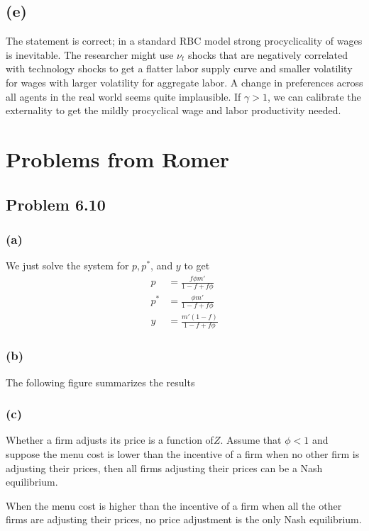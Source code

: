 \documentclass[11pt]{amsart}
\begin{document}
 \subsection*{(e)}
 The statement is correct; in a standard RBC model strong procyclicality of wages is inevitable. 
 The researcher might use $\nu_t$ shocks that are negatively correlated with technology shocks to get a flatter labor supply curve and smaller volatility for wages with larger volatility for aggregate labor. 
A change in preferences across all agents in the real world seems quite implausible.	If $\gamma > 1$, we can calibrate the externality to get the mildly procyclical wage and labor productivity needed. 


\section{Problems from Romer}
\subsection{Problem 6.10}

\subsubsection*{(a)} We just solve the system for $p, p^{*}$, and $y$ to get 
	\begin{align*}
	p & = \frac{f \phi m'}{1 - f + f\phi} \\
	p^{*} & = \frac{\phi m'}{1 - f + f\phi} \\
	y & = \frac{m' (1-f)}{1 - f + f\phi}
	\end{align*}
	
	\subsubsection*{(b)} The following figure summarizes the results
	
	
	\subsubsection*{(c)} Whether a firm adjusts its price is a function of$Z$. 
	Assume that $\phi <1$ and suppose the menu cost is lower than the incentive of a firm when no other firm is adjusting their prices, then all firms adjusting their prices can be a Nash equilibrium. 
	
	When the menu cost is higher than the incentive of a firm when all the other firms are adjusting their prices, no price adjustment is the only Nash equilibrium. 
	
\end{document}

